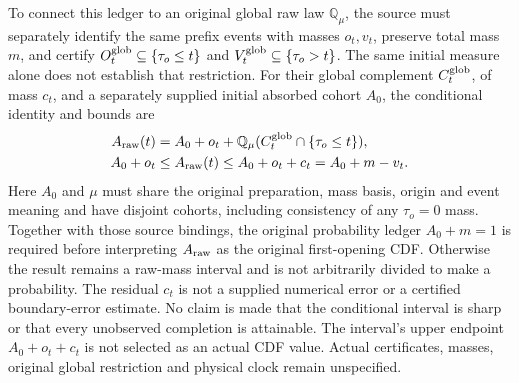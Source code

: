 \documentclass[11pt]{article}
\begin{document}
To connect this ledger to an original global raw law $\mathbb Q_\mu$,
the source must separately identify the same prefix events with masses
$o_t,v_t$, preserve total mass $m$, and certify
$O_t^{\rm glob}\subseteq\{\tau_o\leq t\}$ and
$V_t^{\rm glob}\subseteq\{\tau_o>t\}$. The same initial measure alone
does not establish that restriction. For their global complement
$C_t^{\rm glob}$, of mass $c_t$, and a separately supplied initial
absorbed cohort $A_0$, the conditional identity and bounds are
\begin{equation}
\begin{aligned}
 A_{\rm raw}(t)&=A_0+o_t+
 \mathbb Q_\mu(C_t^{\rm glob}\cap\{\tau_o\leq t\}),\\
 A_0+o_t&\leq A_{\rm raw}(t)\leq A_0+o_t+c_t=A_0+m-v_t.
\end{aligned}
\label{eq:conditional-opening-interval}
\end{equation}
Here $A_0$ and $\mu$ must share the original preparation, mass basis,
origin and event meaning and have disjoint cohorts, including consistency
of any $\tau_o=0$ mass. Together with those source bindings, the original
probability ledger $A_0+m=1$ is required before interpreting
$A_{\rm raw}$ as the original first-opening CDF. Otherwise the result
remains a raw-mass interval and is not arbitrarily divided to make a
probability. The residual $c_t$ is not a supplied numerical error or a certified
boundary-error estimate. No claim is made that the conditional interval
is sharp or that every unobserved completion is attainable.
The interval's upper endpoint $A_0+o_t+c_t$ is not selected as an actual CDF value.
Actual certificates, masses, original global restriction and physical
clock remain unspecified.
\end{document}
